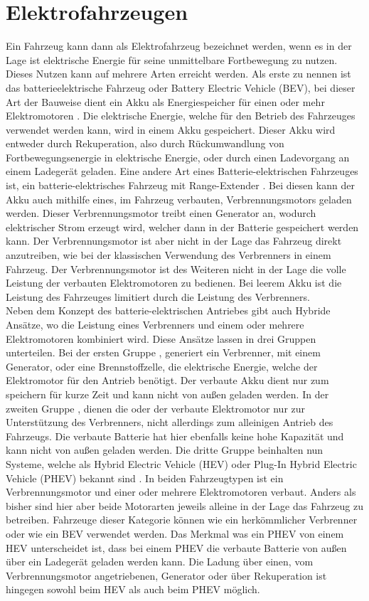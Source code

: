 \section{Elektrofahrzeugen}
Ein Fahrzeug kann dann als Elektrofahrzeug bezeichnet werden, wenn es in der Lage ist elektrische Energie für seine unmittelbare Fortbewegung zu nutzen. Dieses Nutzen kann auf mehrere Arten erreicht werden. Als erste zu nennen ist das batterieelektrische Fahrzeug oder Battery Electric Vehicle (BEV), bei dieser Art der Bauweise dient ein Akku als Energiespeicher für einen oder mehr Elektromotoren \cite{e_auto}. Die elektrische Energie, welche für den Betrieb des Fahrzeuges verwendet werden kann,  wird in einem Akku gespeichert. Dieser Akku wird entweder durch Rekuperation, also durch Rückumwandlung von Fortbewegungsenergie in elektrische Energie, oder durch einen Ladevorgang an einem Ladegerät geladen. Eine andere Art eines Batterie-elektrischen Fahrzeuges ist, ein batterie-elektrisches Fahrzeug mit Range-Extender \cite{e_auto}. Bei diesen kann der Akku auch mithilfe eines, im Fahrzeug verbauten, Verbrennungsmotors geladen werden. Dieser Verbrennungsmotor treibt einen Generator an, wodurch elektrischer Strom erzeugt wird, welcher dann in der Batterie gespeichert werden kann. Der Verbrennungsmotor ist aber nicht in der Lage das Fahrzeug direkt anzutreiben, wie bei der klassischen Verwendung des Verbrenners in einem Fahrzeug. Der Verbrennungsmotor ist des Weiteren nicht in der Lage die volle Leistung der verbauten Elektromotoren zu bedienen. Bei leerem Akku ist die Leistung des Fahrzeuges limitiert durch die Leistung des Verbrenners. \\
Neben dem Konzept des batterie-elektrischen Antriebes gibt auch Hybride Ansätze, wo die Leistung eines Verbrenners und einem oder mehrere Elektromotoren kombiniert wird. Diese Ansätze lassen in drei Gruppen unterteilen. Bei der ersten Gruppe \cite{e_auto}, generiert ein Verbrenner, mit einem Generator, oder eine Brennstoffzelle, die elektrische Energie, welche der Elektromotor für den Antrieb benötigt. Der verbaute Akku dient nur zum speichern für kurze Zeit und kann nicht von außen geladen werden. In der zweiten Gruppe \cite{e_auto}, dienen die oder der verbaute Elektromotor nur zur Unterstützung des Verbrenners, nicht allerdings zum alleinigen Antrieb des Fahrzeugs. Die verbaute Batterie hat hier ebenfalls keine hohe Kapazität und kann nicht von außen geladen werden. Die dritte Gruppe beinhalten nun Systeme, welche als Hybrid Electric Vehicle (HEV) oder Plug-In Hybrid Electric Vehicle (PHEV) bekannt sind \cite{e_auto}. In beiden Fahrzeugtypen ist ein Verbrennungsmotor und einer oder mehrere Elektromotoren verbaut. Anders als bisher sind hier aber beide Motorarten jeweils alleine in der Lage das Fahrzeug zu betreiben. Fahrzeuge dieser Kategorie können wie ein herkömmlicher Verbrenner oder wie ein BEV verwendet werden. Das Merkmal was ein PHEV von einem HEV unterscheidet ist, dass bei einem PHEV die verbaute Batterie von außen über ein Ladegerät geladen werden kann. Die Ladung über einen, vom Verbrennungsmotor angetriebenen, Generator oder über Rekuperation ist hingegen sowohl beim HEV als auch beim PHEV möglich.\\

